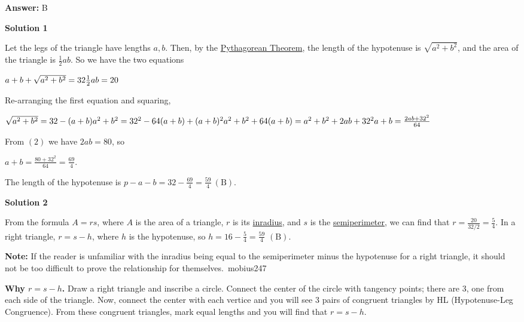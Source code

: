 \begin{enumerate}
 \textbf{Answer: }B



\textbf{Solution 1}

Let the legs of the triangle have lengths $a,b$. Then, by the \href{https://artofproblemsolving.com/wiki/index.php?title=Pythagorean\_Theorem}{Pythagorean Theorem}, the length of the hypotenuse is $\sqrt{a^2+b^2}$, and the area of the triangle is $\frac 12 ab$. So we have the two equations

 $a+b+\sqrt{a^2+b^2} = 32 \\\\ \frac{1}{2}ab = 20$

 

 Re-arranging the first equation and squaring, 

 $\sqrt{a^2+b^2} = 32-(a+b)\\\\ a^2 + b^2 = 32^2 - 64(a+b) + (a+b)^2\\\\ a^2 + b^2 + 64(a+b) = a^2 + b^2 + 2ab + 32^2\\\\ a+b = \frac{2ab+32^2}{64}$

 

 From $(2)$ we have $2ab = 80$, so

 $a+b = \frac{80 + 32^2}{64} = \frac{69}{4}.$

 

 The length of the hypotenuse is $p - a - b = 32 - \frac{69}{4} = \frac{59}{4}\boxed{\ \mathrm{(B)}}$.

 



\textbf{Solution 2}

From the formula $A = rs$, where $A$ is the area of a triangle, $r$ is its \href{https://artofproblemsolving.com/wiki/index.php?title=Inradius}{inradius}, and $s$ is the \href{https://artofproblemsolving.com/wiki/index.php?title=Semiperimeter}{semiperimeter}, we can find that $r = \frac{20}{32/2} = \frac{5}{4}$. In a right triangle, $r = s - h$, where $h$ is the hypotenuse, so $h = 16 - \frac{5}{4} = \frac{59}{4}$ $\mathrm{(B)}$.

 \textbf{Note:} If the reader is unfamiliar with the inradius being equal to the semiperimeter minus the hypotenuse for a right triangle, it should not be too difficult to prove the relationship for themselves.~mobius247

 \textbf{Why $r=s-h$.} Draw a right triangle and inscribe a circle. Connect the center of the circle with tangency points; there are 3, one from each side of the triangle. Now, connect the center with each vertice and you will see 3 pairs of congruent triangles by HL (Hypotenuse-Leg Congruence). From these congruent triangles, mark equal lengths and you will find that $r=s-h$. 


\end{enumerate}
